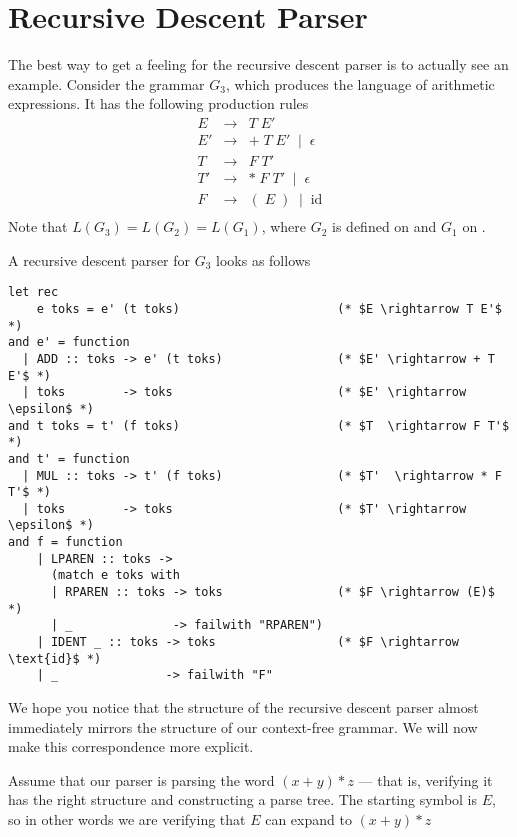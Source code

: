\section{Recursive Descent Parser}
The best way to get a feeling for the recursive descent parser is to actually see an example. Consider the grammar $G_3$, which produces the language of arithmetic expressions. It has the following production rules
\[
\begin{array}{lcl}
  E  &\to& T \;E' \\
  E' &\to& + \;T\; E' \;\mid\; \epsilon\\
  T  &\to& F\; T'\\
  T' &\to& * \;F\; T' \;\mid\; \epsilon\\
  F  &\to& (\;E\;) \;\mid\; \text{id}\\
\end{array}
\]
Note that $L(G_3) = L(G_2) = L(G_1)$, where $G_2$ is defined on  and $G_1$ on .

A recursive descent parser for $G_3$ looks as follows

\begin{code}
\label{code:ocaml-recursive-descent}
\begin{verbatim}
let rec
    e toks = e' (t toks)                      (* $E \rightarrow T E'$ *)
and e' = function
  | ADD :: toks -> e' (t toks)                (* $E' \rightarrow + T E'$ *)
  | toks        -> toks                       (* $E' \rightarrow \epsilon$ *)
and t toks = t' (f toks)                      (* $T  \rightarrow F T'$ *)
and t' = function
  | MUL :: toks -> t' (f toks)                (* $T'  \rightarrow * F T'$ *)
  | toks        -> toks                       (* $T' \rightarrow \epsilon$ *)
and f = function
    | LPAREN :: toks ->
      (match e toks with
      | RPAREN :: toks -> toks                (* $F \rightarrow (E)$ *) 
      | _              -> failwith "RPAREN")
    | IDENT _ :: toks -> toks                 (* $F \rightarrow \text{id}$ *)
    | _               -> failwith "F"
\end{verbatim}
\end{code}

We hope you notice that the structure of the recursive descent parser almost immediately mirrors the structure of our context-free grammar. We will now make this correspondence more explicit.

Assume that our parser is parsing the word $(x + y) * z$ --- that is, verifying it has the right structure and constructing a parse tree. The starting symbol is $E$, so in other words we are verifying that $E$ can expand to $(x + y) * z$

